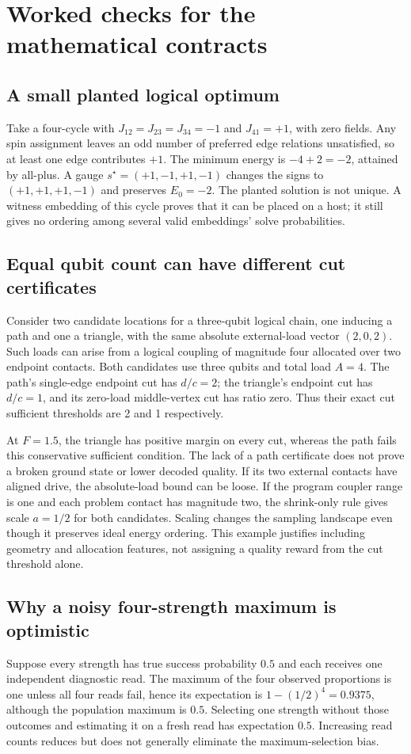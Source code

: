 \section{Worked checks for the mathematical contracts}\label{app:worked}
\subsection{A small planted logical optimum}
Take a four-cycle with $J_{12}=J_{23}=J_{34}=-1$ and $J_{41}=+1$, with zero fields. Any spin assignment leaves an odd number of preferred edge relations unsatisfied, so at least one edge contributes $+1$. The minimum energy is $-4+2=-2$, attained by all-plus. A gauge $s^\star=(+1,-1,+1,-1)$ changes the signs to $(+1,+1,+1,-1)$ and preserves $E_0=-2$. The planted solution is not unique. A witness embedding of this cycle proves that it can be placed on a host; it still gives no ordering among several valid embeddings' solve probabilities.

\subsection{Equal qubit count can have different cut certificates}
Consider two candidate locations for a three-qubit logical chain, one inducing a path and one a triangle, with the same absolute external-load vector $(2,0,2)$. Such loads can arise from a logical coupling of magnitude four allocated over two endpoint contacts. Both candidates use three qubits and total load $A=4$. The path's single-edge endpoint cut has $d/c=2$; the triangle's endpoint cut has $d/c=1$, and its zero-load middle-vertex cut has ratio zero. Thus their exact cut sufficient thresholds are 2 and 1 respectively.

At $F=1.5$, the triangle has positive margin on every cut, whereas the path fails this conservative sufficient condition. The lack of a path certificate does not prove a broken ground state or lower decoded quality. If its two external contacts have aligned drive, the absolute-load bound can be loose. If the program coupler range is one and each problem contact has magnitude two, the shrink-only rule gives scale $a=1/2$ for both candidates. Scaling changes the sampling landscape even though it preserves ideal energy ordering. This example justifies including geometry and allocation features, not assigning a quality reward from the cut threshold alone.

\subsection{Why a noisy four-strength maximum is optimistic}
Suppose every strength has true success probability $0.5$ and each receives one independent diagnostic read. The maximum of the four observed proportions is one unless all four reads fail, hence its expectation is $1-(1/2)^4=0.9375$, although the population maximum is $0.5$. Selecting one strength without those outcomes and estimating it on a fresh read has expectation $0.5$. Increasing read counts reduces but does not generally eliminate the maximum-selection bias.

